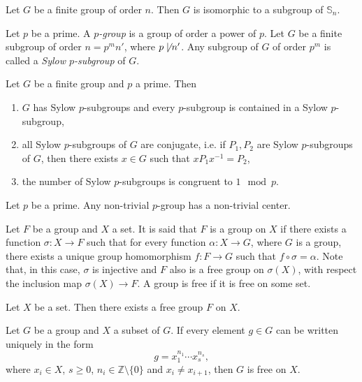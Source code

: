 {\begin{theorem}
    Let $G$ be a finite group of order $n$. Then $G$ is isomorphic to a subgroup of $\mathbb{S}_n$.
\end{theorem}

Let $p$ be a prime. A {\em $p$-group} is a group of order a power of $p$. Let $G$ be a finite subgroup of order
$n=p^mn'$, where $p\not\mid n'$. Any subgroup of $G$ of order $p^m$ is called a {\em Sylow $p$-subgroup} of $G$.

\begin{theorem}[Sylow]
    Let $G$ be a finite group and $p$ a prime. Then
    \begin{enumerate}
        \item $G$ has Sylow $p$-subgroups and every $p$-subgroup is contained in a Sylow $p$-subgroup,
        \item all Sylow $p$-subgroups of $G$ are conjugate, i.e. if $P_1,P_2$ are Sylow $p$-subgroups of $G$, 
        then there exists $x\in G$ such that $xP_1x^{-1}=P_2$,
        \item the number of Sylow $p$-subgroups is congruent to $1\mod p$.
    \end{enumerate}
\end{theorem}

\begin{theorem}
    Let $p$ be a prime. Any non-trivial $p$-group has a non-trivial center.
\end{theorem}

Let $F$ be a group and $X$ a set. It is said that $F$ is a {\free group} on $X$ if there exists a function
$\sigma\colon X\rightarrow F$ such that for every function $\alpha\colon X\rightarrow G$, where $G$ is a group, there exists 
a unique group homomorphism $f\colon F\rightarrow G$ such that $f\circ \sigma=\alpha$. Note that, in this case, 
$\sigma$ is injective and $F$ also is a free group on $\sigma(X)$, with respect the inclusion map $\sigma(X)\rightarrow F$.
A group is free if it is free on some set.

\begin{theorem}
    Let $X$ be a set. Then there exists a free group $F$ on $X$.
\end{theorem}

\begin{proposition}
    Let $G$ be a group and $X$ a subset of $G$. If every element $g\in G$ can be written uniquely in the form
    \begin{equation}\label{1normalform}
    g=x_1^{n_1}\cdots x_s^{n_s},
    \end{equation}
    where $x_i\in X$, $s\geq 0$, $n_i\in \mathbb{Z}\setminus \{0\}$ and $x_i\neq x_{i+1}$, then $G$ is free on $X$. 
\end{proposition}

}
